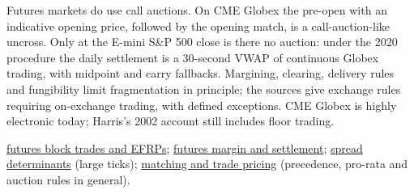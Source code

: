 \begin{qfconvention}
 Futures markets do use call auctions. On CME Globex the pre-open with an indicative opening price, followed by the opening match, is a call-auction-like uncross. Only at the E-mini S\&P 500 close is there no auction: under the 2020 procedure the daily settlement is a 30-second VWAP of continuous Globex trading, with midpoint and carry fallbacks. Margining, clearing, delivery rules and fungibility limit fragmentation in principle; the sources give exchange rules requiring on-exchange trading, with defined exceptions. CME Globex is highly electronic today; Harris's 2002 account still includes floor trading.

 \hyperref[conv:futures-block-efrp]{futures block trades and EFRPs}; \hyperref[mech:futures-margin-settlement]{futures margin and settlement}; \hyperref[res:spread-determinants]{spread determinants} (large ticks); \hyperref[mech:order-matching-pricing]{matching and trade pricing} (precedence, pro-rata and auction rules in general).

\end{qfconvention}

